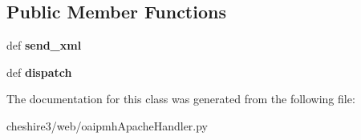 \subsection*{Public Member Functions}
\begin{DoxyCompactItemize}
\item 
\hypertarget{classcheshire3_1_1web_1_1oaipmh_apache_handler_1_1req_handler_a0dcdf32651262a0f859b8ccfaefa220e}{def {\bfseries send\-\_\-xml}}\label{classcheshire3_1_1web_1_1oaipmh_apache_handler_1_1req_handler_a0dcdf32651262a0f859b8ccfaefa220e}

\item 
\hypertarget{classcheshire3_1_1web_1_1oaipmh_apache_handler_1_1req_handler_ac21d0779c7a3ddf4c5f1e12ff1539ba1}{def {\bfseries dispatch}}\label{classcheshire3_1_1web_1_1oaipmh_apache_handler_1_1req_handler_ac21d0779c7a3ddf4c5f1e12ff1539ba1}

\end{DoxyCompactItemize}


The documentation for this class was generated from the following file\-:\begin{DoxyCompactItemize}
\item 
cheshire3/web/oaipmh\-Apache\-Handler.\-py\end{DoxyCompactItemize}
